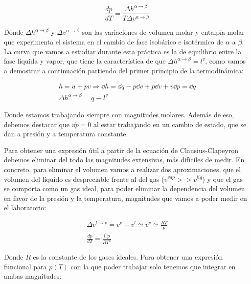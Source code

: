 \documentclass[a4paper,12pt,titlepage]{article}
\begin{document}
\begin{equation}
    \frac{dp}{dT} =\frac{\Delta h^{\alpha \to \beta}}{T\Delta v^{\alpha \to \beta}}
\end{equation}

Donde $\Delta h^{\alpha \to \beta}$ y $\Delta v^{\alpha \to \beta}$ son las variaciones de volumen molar y entalpía molar que experimenta el sistema en el cambio de fase isobárico e isotérmico de $\alpha$ a $\beta$. La curva que vamos a estudiar durante esta práctica es la de equilibrio entre la fase líquida y vapor, que tiene la característica de que $\Delta h^{\alpha \to \beta}=l^v$, como vamos a demostrar a continuación partiendo del primer principio de la termodinámica:

\begin{equation}
    \begin{gathered}
    h = u + pv \Rightarrow \dd h = \dd q - p\dd v + p\dd v + v\dd p = \dd q \\
    \Delta h^{\alpha \to \beta} = q \equiv l^v
    \end{gathered}
\end{equation}

Donde estamos trabajando siempre con magnitudes molares. Además de eso, debemos destacar que $\dd p=0$ al estar trabajando en un cambio de estado, que se dan a presión y a temperatura constante.

Para obtener una expresión útil a partir de la ecuación de Clausius-Clapeyron debemos eliminar del todo las magnitudes extensivas, más difíciles de medir. En concreto, para eliminar el volumen vamos a realizar dos aproximaciones, que el volumen del líquido es despreciable frente al del gas ($v^{vap}>>v^{liq}$) y que el gas se comporta como un gas ideal, para poder eliminar la dependencia del volumen en favor de la presión y la temperatura, magnitudes que vamos a poder medir en el laboratorio:

\begin{equation}
    \begin{gathered}
        \Delta v^{l\to v} = v^v - v^l \simeq v^v \simeq \frac{RT}{p}\\
        \frac{dp}{dT} = \frac{l^v p}{RT^2}
    \end{gathered}
\end{equation}

Donde $R$ es la constante de los gases ideales. Para obtener una expresión funcional para $p(T)$ con la que poder trabajar solo tenemos que integrar en ambas magnitudes:
\end{document}

